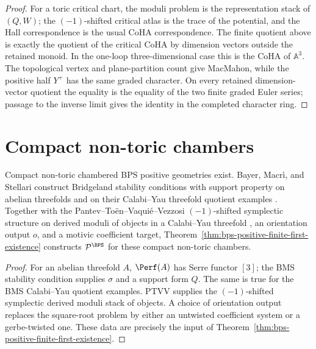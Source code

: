 \begin{proof}
For a toric critical chart, the moduli problem is the representation
stack of \((Q,W)\); the \((-1)\)-shifted critical atlas is the trace of
the potential, and the Hall correspondence is the usual CoHA
correspondence. The finite quotient above is exactly the quotient of
the critical CoHA by dimension vectors outside the retained monoid. In
the one-loop three-dimensional case this is the CoHA of \(\mathbb A^3\).
The topological vertex and plane-partition count give MacMahon, while
the positive half \(Y^+\) has the same graded character. On every
retained dimension-vector quotient the equality is the equality of the
two finite graded Euler series; passage to the inverse limit gives the
identity in the completed character ring.
\end{proof}

\section{Compact non-toric chambers}

\begin{theorem}
\label{thm:bps-positive-compact-nontoric}
Compact non-toric chambered BPS positive geometries exist. Bayer,
Macr\`i, and Stellari construct Bridgeland stability conditions with
support property on abelian threefolds and on their Calabi--Yau
threefold quotient examples \cite{BayerMacriStellari2016}. Together
with the Pantev--To\"en--Vaqui\'e--Vezzosi \((-1)\)-shifted symplectic
structure on derived moduli of objects in a Calabi--Yau threefold
\cite{PTVV2013}, an orientation output \(o\), and a motivic
coefficient target, Theorem~\ref{thm:bps-positive-finite-first-existence}
constructs \(\mathcal P^{\BPS}\) for these compact non-toric chambers.
\end{theorem}

\begin{proof}
For an abelian threefold \(A\), \(\Perf(A)\) has Serre functor \([3]\);
the BMS stability condition supplies \(\sigma\) and a support form
\(Q\). The same is true for the BMS Calabi--Yau quotient examples.
PTVV supplies the \((-1)\)-shifted symplectic derived moduli stack of
objects. A choice of orientation output replaces the square-root
problem by either an untwisted coefficient system or a gerbe-twisted
one. These data are precisely the input of
Theorem~\ref{thm:bps-positive-finite-first-existence}.
\end{proof}

